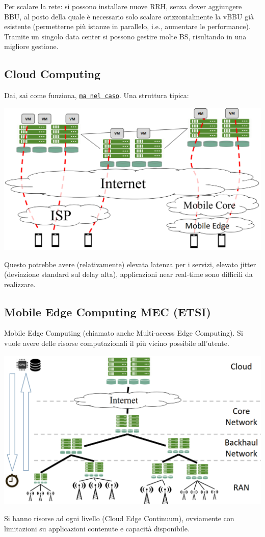Per scalare la rete: si possono installare nuove RRH, senza dover aggiungere BBU, al posto della quale è necessario solo scalare orizzontalmente la vBBU già esistente (permetterne più istanze in parallelo, i.e., aumentare le performance). Tramite un singolo data center si possono gestire molte BS, risultando in una migliore gestione.\\

\subsection*{Cloud Computing}
Dai, sai come funziona, \href{https://it.wikipedia.org/wiki/Cloud_computing}{\texttt{ma nel caso}}. Una struttura tipica:
\begin{center}
	\includegraphics[width=0.8\linewidth]{img/5g/clud}
\end{center}
Questo potrebbe avere (relativamente) elevata latenza per i servizi, elevato jitter (deviazione standard sul delay alta), applicazioni near real-time sono difficili da realizzare.

\newpage

\subsection{Mobile Edge Computing MEC (ETSI)}

Mobile Edge Computing (chiamato anche Multi-access Edge Computing). Si vuole avere delle risorse computazionali il più vicino possibile all'utente. 
\begin{center}
	\includegraphics[width=0.9\linewidth]{img/5g/mec}
\end{center}
Si hanno risorse ad ogni livello (Cloud Edge Continuum), ovviamente con limitazioni su applicazioni contenute e capacità disponibile.\\

